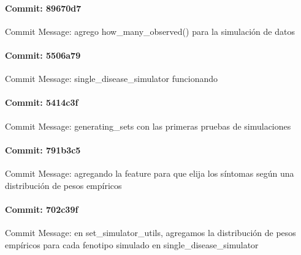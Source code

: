 \documentclass{article}
\begin{document}
\paragraph{Commit: 89670d7}
Commit Message: agrego how_many_observed() para la simulación de datos

\paragraph{Commit: 5506a79}
Commit Message: single_disease_simulator funcionando

\paragraph{Commit: 5414c3f}
Commit Message: generating_sets con las primeras pruebas de simulaciones

\paragraph{Commit: 791b3c5}
Commit Message: agregando la feature para que elija los síntomas según una distribución de pesos empíricos

\paragraph{Commit: 702c39f}
Commit Message: en set_simulator_utils, agregamos la distribución de pesos empíricos para cada fenotipo simulado en single_disease_simulator

\end{document}

